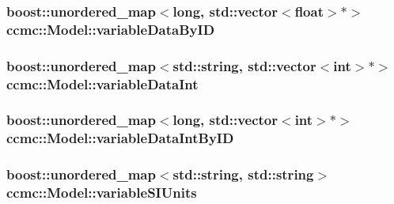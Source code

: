 \hypertarget{classccmc_1_1_model_ad73147779c03081227de041ffe4542a8}{
\subsubsection[{variable\-Data\-By\-I\-D}]{\setlength{\rightskip}{0pt plus 5cm}boost\-::unordered\-\_\-map$<$long, std\-::vector$<$float$>$$\ast$$>$ ccmc\-::\-Model\-::variable\-Data\-By\-I\-D\hspace{0.3cm}{\ttfamily [protected]}}}\label{classccmc_1_1_model_ad73147779c03081227de041ffe4542a8}
\hypertarget{classccmc_1_1_model_a7dd720b592092ee2e1f24c162b712606}{
\subsubsection[{variable\-Data\-Int}]{\setlength{\rightskip}{0pt plus 5cm}boost\-::unordered\-\_\-map$<$std\-::string, std\-::vector$<$int$>$$\ast$$>$ ccmc\-::\-Model\-::variable\-Data\-Int\hspace{0.3cm}{\ttfamily [protected]}}}\label{classccmc_1_1_model_a7dd720b592092ee2e1f24c162b712606}
\hypertarget{classccmc_1_1_model_a699883059cbb36f977a724c7855b0d76}{
\subsubsection[{variable\-Data\-Int\-By\-I\-D}]{\setlength{\rightskip}{0pt plus 5cm}boost\-::unordered\-\_\-map$<$long, std\-::vector$<$int$>$$\ast$$>$ ccmc\-::\-Model\-::variable\-Data\-Int\-By\-I\-D\hspace{0.3cm}{\ttfamily [protected]}}}\label{classccmc_1_1_model_a699883059cbb36f977a724c7855b0d76}
\hypertarget{classccmc_1_1_model_af782a4c86004df7b9388562551ae87ad}{
\subsubsection[{variable\-S\-I\-Units}]{\setlength{\rightskip}{0pt plus 5cm}boost\-::unordered\-\_\-map$<$std\-::string, std\-::string$>$ ccmc\-::\-Model\-::variable\-S\-I\-Units\hspace{0.3cm}{\ttfamily [protected]}}}\label{classccmc_1_1_model_af782a4c86004df7b9388562551ae87ad}


